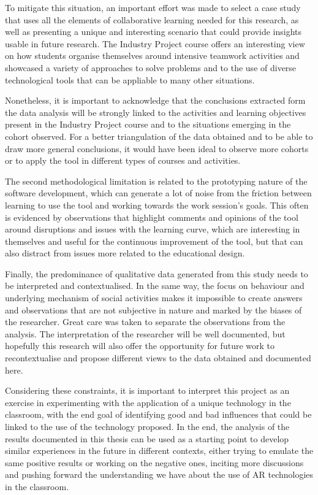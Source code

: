 To mitigate this situation, an important effort was made to select a case study that uses all the elements of collaborative learning needed for this research, as well as presenting
a unique and interesting scenario that could provide insights usable in future research. The Industry Project course offers an interesting view on how students organise themselves
around intensive teamwork activities and showcased a variety of approaches to solve problems and to the use of diverse technological tools that can be appliable to many other
situations.

Nonetheless, it is important to acknowledge that the conclusions extracted form the data analysis will be strongly linked to the activities and learning objectives present in the
Industry Project course and to the situations emerging in the cohort observed. For a better triangulation of the data obtained and to be able to draw more general conclusions, it
would have been ideal to observe more cohorts or to apply the tool in different types of courses and activities.

The second methodological limitation is related to the prototyping nature of the software development, which can generate a lot of noise from the friction between learning to use
the tool and working towards the work session's goals. This often is evidenced by observations that highlight comments and opinions of the tool around disruptions and issues with
the learning curve, which are interesting in themselves and useful for the continuous improvement of the tool, but that can also distract from issues more related to the educational
design.

Finally, the predominance of qualitative data generated from this study needs to be interpreted and contextualised. In the same way, the focus on behaviour and underlying mechanism
of social activities makes it impossible to create answers and observations that are not subjective in nature and marked by the biases of the researcher. Great care was taken
to separate the observations from the analysis. The interpretation of the researcher will be well documented, but hopefully this research will also offer the opportunity for future
work to recontextualise and propose different views to the data obtained and documented here.

Considering these constraints, it is important to interpret this project as an exercise in experimenting with the application of a unique technology in the classroom, with the end
goal of identifying good and bad influences that could be linked to the use of the technology proposed. In the end, the analysis of the results documented in this thesis can be used
as a starting point to develop similar experiences in the future in different contexts, either trying to emulate the same positive results or working on the negative ones, inciting
more discussions and pushing forward the understanding we have about the use of \ac{AR} technologies in the classroom.

